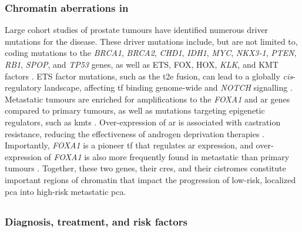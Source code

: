 \subsubsection{Chromatin aberrations in }

Large cohort studies of prostate tumours have identified numerous driver mutations for the disease.
These driver mutations include, but are not limited to, coding mutations to the \emph{BRCA1}, \emph{BRCA2}, \emph{CHD1}, \emph{IDH1}, \emph{MYC}, \emph{NKX3-1}, \emph{PTEN}, \emph{RB1}, \emph{SPOP}, and \emph{TP53} genes, as well as ETS, FOX, HOX, \emph{KLK}, and KMT factors \cite{fraserGenomicHallmarksLocalized2017,pcf/su2cinternationalprostatecancerdreamteamLongTailOncogenic2018,abeshouseMolecularTaxonomyPrimary2015}.
ETS factor mutations, such as the \gls{t2e} fusion, can lead to a globally \emph{cis}-regulatory landscape, affecting \gls{tf} binding genome-wide and \emph{NOTCH} signalling \cite{kronTMPRSS2ERGFusion2017}.
Metastatic tumours are enriched for amplifications to the \emph{FOXA1} and \gls{ar} genes compared to primary tumours, as well as mutations targeting epigenetic regulators, such as \glspl{kmt} \cite{grassoMutationalLandscapeLethal2012,robinsonIntegrativeClinicalGenomics2015,quigleyGenomicHallmarksStructural2018}.
Over-expression of \gls{ar} is associated with castration resistance, reducing the effectiveness of androgen deprivation therapies \cite{quigleyGenomicHallmarksStructural2018,daskivichRecentProgressHormonal2006}.
Importantly, \emph{FOXA1} is a pioneer \gls{tf} that regulates \gls{ar} expression, and over-expression of \emph{FOXA1} is also more frequently found in metastatic than primary tumours \cite{tengPioneerProstateCancer2021}.
Together, these two genes, their \glspl{cre}, and their cistromes constitute important regions of chromatin that impact the progression of low-risk, localized \gls{pca} into high-risk metastatic \gls{pca}.

\subsection{}

\subsubsection{Diagnosis, treatment, and risk factors}

